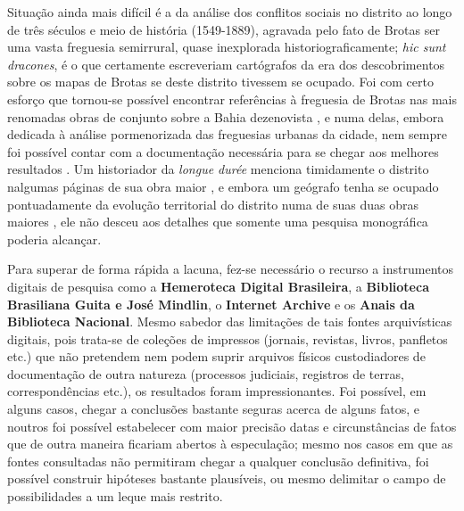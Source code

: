 Situação ainda mais difícil é a da análise dos conflitos sociais no distrito ao longo de três séculos e meio de história (1549-1889), agravada pelo fato de Brotas ser uma vasta freguesia semirrural, quase inexplorada historiograficamente; \textit{hic sunt dracones}, é o que certamente escreveriam cartógrafos da era dos descobrimentos sobre os mapas de Brotas se deste distrito tivessem se ocupado. Foi com certo esforço que tornou-se possível encontrar referências à freguesia de Brotas nas mais renomadas obras de conjunto sobre a Bahia dezenovista \cite{MATTOSO1978, MATTOSO1992, NASCIMENTO2007}, e numa delas, embora dedicada à análise pormenorizada das freguesias urbanas da cidade, nem sempre foi possível contar com a documentação necessária para se chegar aos melhores resultados \cite{NASCIMENTO2007}. Um historiador da \textit{longue durée} menciona timidamente o distrito nalgumas páginas de sua obra maior \cite{TAVARES2008}, e embora um geógrafo tenha se ocupado pontuadamente da evolução territorial do distrito numa de suas duas obras maiores \cite{VASCONCELOS2002}, ele não desceu aos detalhes que somente uma pesquisa monográfica poderia alcançar. 

Para superar de forma rápida a lacuna, fez-se necessário o recurso a instrumentos digitais de pesquisa como a \textbf{Hemeroteca Digital Brasileira}, a \textbf{Biblioteca Brasiliana Guita e José Mindlin}, o \textbf{Internet Archive} e os \textbf{Anais da Biblioteca Nacional}. Mesmo sabedor das limitações de tais fontes arquivísticas digitais, pois trata-se de coleções de impressos (jornais, revistas, livros, panfletos etc.) que não pretendem nem podem suprir arquivos físicos custodiadores de documentação de outra natureza (processos judiciais, registros de terras, correspondências etc.), os resultados foram impressionantes. Foi possível, em alguns casos, chegar a conclusões bastante seguras acerca de alguns fatos, e noutros foi possível estabelecer com maior precisão datas e circunstâncias de fatos que de outra maneira ficariam abertos à especulação; mesmo nos casos em que as fontes consultadas não permitiram chegar a qualquer conclusão definitiva, foi possível construir hipóteses bastante plausíveis, ou mesmo delimitar o campo de possibilidades a um leque mais restrito.







%
